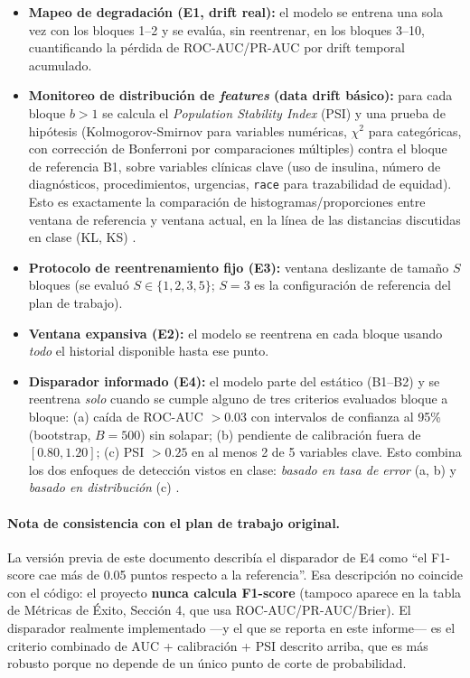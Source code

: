 \documentclass[11pt,a4paper]{article}
\begin{document}
\begin{itemize}[leftmargin=*]
    \item \textbf{Mapeo de degradación (E1, drift real):} el modelo se entrena una sola vez con los bloques 1--2 y se evalúa, sin reentrenar, en los bloques 3--10, cuantificando la pérdida de ROC-AUC/PR-AUC por drift temporal acumulado.
    \item \textbf{Monitoreo de distribución de \emph{features} (data drift básico):} para cada bloque $b>1$ se calcula el \emph{Population Stability Index} (PSI) \cite{siddiqi2006} y una prueba de hipótesis (Kolmogorov-Smirnov para variables numéricas, $\chi^2$ para categóricas, con corrección de Bonferroni por comparaciones múltiples) contra el bloque de referencia B1, sobre variables clínicas clave (uso de insulina, número de diagnósticos, procedimientos, urgencias, \texttt{race} para trazabilidad de equidad). Esto es exactamente la comparación de histogramas/proporciones entre ventana de referencia y ventana actual, en la línea de las distancias discutidas en clase (KL, KS) \cite{soriano2026}.
    \item \textbf{Protocolo de reentrenamiento fijo (E3):} ventana deslizante de tamaño $S$ bloques (se evaluó $S\in\{1,2,3,5\}$; $S=3$ es la configuración de referencia del plan de trabajo).
    \item \textbf{Ventana expansiva (E2):} el modelo se reentrena en cada bloque usando \emph{todo} el historial disponible hasta ese punto.
    \item \textbf{Disparador informado (E4):} el modelo parte del estático (B1--B2) y se reentrena \emph{solo} cuando se cumple alguno de tres criterios evaluados bloque a bloque: (a) caída de ROC-AUC $>0.03$ con intervalos de confianza al 95\% (bootstrap, $B=500$) sin solapar; (b) pendiente de calibración fuera de $[0.80,1.20]$; (c) PSI $>0.25$ en al menos 2 de 5 variables clave. Esto combina los dos enfoques de detección vistos en clase: \emph{basado en tasa de error} (a, b) y \emph{basado en distribución} (c) \cite{soriano2026,bifet2007,page1954}.
\end{itemize}

\paragraph{Nota de consistencia con el plan de trabajo original.} La versión previa de este documento describía el disparador de E4 como ``el F1-score cae más de 0.05 puntos respecto a la referencia''. Esa descripción no coincide con el código: el proyecto \textbf{nunca calcula F1-score} (tampoco aparece en la tabla de Métricas de Éxito, Sección 4, que usa ROC-AUC/PR-AUC/Brier). El disparador realmente implementado —y el que se reporta en este informe— es el criterio combinado de AUC + calibración + PSI descrito arriba, que es más robusto porque no depende de un único punto de corte de probabilidad.
\end{document}
